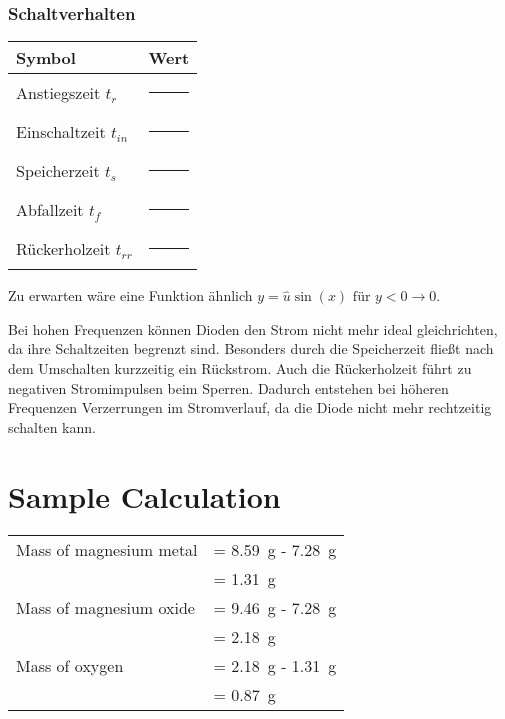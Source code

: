 \documentclass[
	a4paper, %
	12pt, %
]{CSUniSchoolLabReport}
\begin{document}
\subsubsection{Schaltverhalten}

\vspace{1em} 

\begin{center}
\begin{tabular}{ll}
\toprule
\textbf{Symbol} & \textbf{Wert} \\
\midrule
Anstiegszeit $t_r$       & \rule{3cm}{0.4pt} \\
Einschaltzeit $t_{in}$   & \rule{3cm}{0.4pt} \\
Speicherzeit  $t_s$      & \rule{3cm}{0.4pt} \\
Abfallzeit $t_f$         & \rule{3cm}{0.4pt} \\
Rückerholzeit $t_{rr}$   & \rule{3cm}{0.4pt} \\
\bottomrule
\end{tabular}
\end{center}

\vspace{1em} 

Zu erwarten wäre eine Funktion ähnlich $y = \hat{u}\sin(x) \text{ für } y < 0 \rightarrow 0$.\par
Bei hohen Frequenzen können Dioden den Strom nicht mehr ideal gleichrichten, da ihre Schaltzeiten begrenzt sind. Besonders durch die Speicherzeit fließt nach dem Umschalten kurzzeitig ein Rückstrom. Auch die Rückerholzeit führt zu negativen Stromimpulsen beim Sperren. Dadurch entstehen bei höheren Frequenzen Verzerrungen im Stromverlauf, da die Diode nicht mehr rechtzeitig schalten kann.
\section{Sample Calculation}

\begin{tabular}{ll}
	Mass of magnesium metal & = \SI{8.59}{\gram} - \SI{7.28}{\gram}\\
	& = \SI{1.31}{\gram}\\
	Mass of magnesium oxide & = \SI{9.46}{\gram} - \SI{7.28}{\gram}\\
	& = \SI{2.18}{\gram}\\
	Mass of oxygen & = \SI{2.18}{\gram} - \SI{1.31}{\gram}\\
	& = \SI{0.87}{\gram}
\end{tabular}
\end{document}
